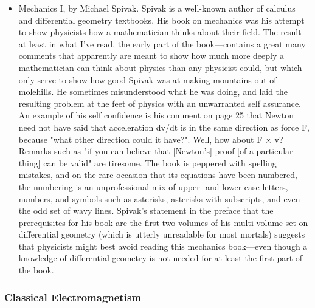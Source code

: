 \documentclass[10pt,a4paper]{book}
\theoremstyle{definition}
\begin{document}
\begin{itemize}
\item Mechanics I, by Michael Spivak.
Spivak is a well-known author of calculus and differential geometry textbooks.  His book on mechanics was his attempt to show physicists how a mathematician thinks about their field.  The result—at least in what I've read, the early part of the book—contains a great many comments that apparently are meant to show how much more deeply a mathematician can think about physics than any physicist could, but which only serve to show how good Spivak was at making mountains out of molehills.  He sometimes misunderstood what he was doing, and laid the resulting problem at the feet of physics with an unwarranted self assurance.  An example of his self confidence is his comment on page 25 that Newton need not have said that acceleration dv/dt is in the same direction as force F, because "what other direction could it have?".  Well, how about F × v?  Remarks such as "if you can believe that [Newton's] proof [of a particular thing] can be valid" are tiresome.  The book is peppered with spelling mistakes, and on the rare occasion that its equations have been numbered, the numbering is an unprofessional mix of upper- and lower-case letters, numbers, and symbols such as asterisks, asterisks with subscripts, and even the odd set of wavy lines.  Spivak's statement in the preface that the prerequisites for his book are the first two volumes of his multi-volume set on differential geometry (which is utterly unreadable for most mortals) suggests that physicists might best avoid reading this mechanics book—even though a knowledge of differential geometry is not needed for at least the first part of the book.
\end{itemize}


\subsubsection{Classical Electromagnetism}
\end{document}
